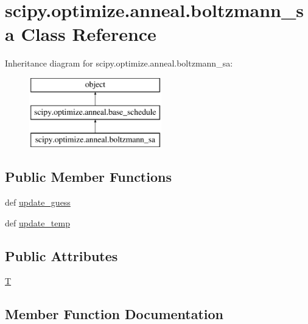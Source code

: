 \hypertarget{classscipy_1_1optimize_1_1anneal_1_1boltzmann__sa}{}\section{scipy.\+optimize.\+anneal.\+boltzmann\+\_\+sa Class Reference}
\label{classscipy_1_1optimize_1_1anneal_1_1boltzmann__sa}
Inheritance diagram for scipy.\+optimize.\+anneal.\+boltzmann\+\_\+sa\+:\begin{figure}[H]
\begin{center}
\leavevmode
\includegraphics[height=3.000000cm]{classscipy_1_1optimize_1_1anneal_1_1boltzmann__sa}
\end{center}
\end{figure}
\subsection*{Public Member Functions}
\begin{DoxyCompactItemize}
\item 
def \hyperlink{classscipy_1_1optimize_1_1anneal_1_1boltzmann__sa_a6e6bc82d248049706296de35ed979dc8}{update\+\_\+guess}
\item 
def \hyperlink{classscipy_1_1optimize_1_1anneal_1_1boltzmann__sa_ac7026350f1f33ad3e2539f56d3e6f7ea}{update\+\_\+temp}
\end{DoxyCompactItemize}
\subsection*{Public Attributes}
\begin{DoxyCompactItemize}
\item 
\hyperlink{classscipy_1_1optimize_1_1anneal_1_1boltzmann__sa_a60a1bce384386615af365035d66ac829}{T}
\end{DoxyCompactItemize}


\subsection{Member Function Documentation}
\hypertarget{classscipy_1_1optimize_1_1anneal_1_1boltzmann__sa_a6e6bc82d248049706296de35ed979dc8}{}
